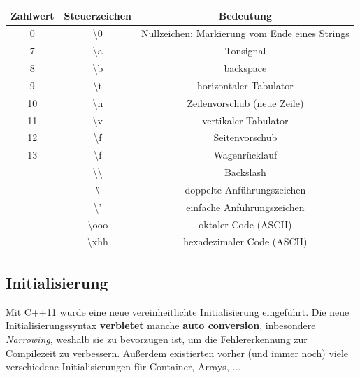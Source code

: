 \documentclass[a4paper]{report}
\begin{document}
\begin{center}
\begin{tabular}{|ccc|} \hline
	\textbf{Zahlwert} & \textbf{Steuerzeichen} & \textbf{Bedeutung} \\ \hline
	0 & \textbackslash 0 & Nullzeichen: Markierung vom Ende eines Strings \\
	7 & \textbackslash a & Tonsignal \\ \hline
	8 & \textbackslash b & backspace \\
	9 & \textbackslash t & horizontaler Tabulator \\ \hline
	10 & \textbackslash n & Zeilenvorschub (neue Zeile) \\
	11 & \textbackslash v & vertikaler Tabulator \\ \hline
	12 & \textbackslash f & Seitenvorschub \\
	13 & \textbackslash f & Wagenrücklauf \\ \hline
	& \textbackslash \textbackslash & Backslash \\
	& \textbackslash \" & doppelte Anführungszeichen \\ \hline
	& \textbackslash ' & einfache Anführungszeichen \\
	& \textbackslash ooo & oktaler Code (ASCII) \\ \hline
	& \textbackslash xhh & hexadezimaler Code (ASCII) \\ \hline
\end{tabular}
	\end{center}


\subsection{Initialisierung}
Mit C++11 wurde eine neue vereinheitlichte Initialisierung eingeführt. Die neue Initialisierungssyntax \textbf{verbietet} manche \textbf{auto conversion}, inbesondere \textit{Narrowing}, weshalb sie zu bevorzugen ist, um die Fehlererkennung zur Compilezeit zu verbessern. Außerdem existierten vorher (und immer noch) viele verschiedene Initialisierungen für Container, Arrays, ... .
\end{document}
